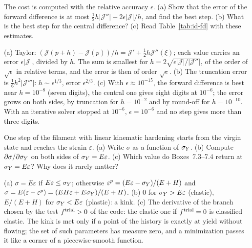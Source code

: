 \label{exo:id-q-fd}
%
The cost is computed with the relative accuracy $\epsilon$. (a) Show that the error
of the forward difference is at most
$\tfrac12h|\mathcal J''|+2\epsilon|\mathcal J|/h$, and find the best step. (b) What is the
best step for the central difference? (c) Read Table~\ref{tab:id-fd} with these
estimates.
\begin{solution}
(a) Taylor: $(\mathcal J(p+h)-\mathcal J(p))/h=\mathcal J'+\tfrac12h\mathcal J''(\xi)$; each value carries
an error $\epsilon|\mathcal J|$, divided by $h$. The sum is smallest for
$h=2\sqrt{\epsilon|\mathcal J|/|\mathcal J''|}$, of the order of $\sqrt\epsilon$ in relative terms,
and the error is then of order $\sqrt\epsilon$. (b) The truncation error is
$\tfrac16h^2|\mathcal J'''|$: $h\sim\epsilon^{1/3}$, error $\epsilon^{2/3}$. (c) With
$\epsilon\approx10^{-15}$, the forward difference is best near $h=10^{-8}$ (seven digits),
the central one gives eight digits at $10^{-6}$; the error grows on both sides, by
truncation for $h=10^{-2}$ and by round-off for $h=10^{-10}$. With an iterative
solver stopped at $10^{-6}$, $\epsilon=10^{-6}$ and no step gives more than three
digits.
\end{solution}

\label{exo:id-q-kink}
%
One step of the filament with linear kinematic hardening starts from the virgin
state and reaches the strain $\varepsilon$. (a) Write $\sigma$ as a function of $\sigma_{Y}$.
(b) Compute $\partial\sigma/\partial\sigma_{Y}$ on both sides of $\sigma_{Y}=E\varepsilon$. (c) Which
value do Boxes~7.3--7.4 return at $\sigma_{Y}=E\varepsilon$? Why does it rarely matter?
\begin{solution}
(a) $\sigma=E\varepsilon$ if $E\varepsilon\le\sigma_{Y}$; otherwise
$\varepsilon^p=(E\varepsilon-\sigma_{Y})/(E+H)$ and $\sigma=E(\varepsilon-\varepsilon^p)=(EH\varepsilon+E\sigma_{Y})/(E+H)$.
(b) $0$ for $\sigma_{Y}>E\varepsilon$ (elastic), $E/(E+H)$ for $\sigma_{Y}<E\varepsilon$ (plastic): a
kink. (c) The derivative of the branch chosen by the test $f^{\mathrm{trial}}>0$ of the code:
the elastic one if $f^{\mathrm{trial}}=0$ is classified elastic. The kink is met only if a
point of the history is exactly at yield without flowing; the set of such
parameters has measure zero, and a minimization passes it like a corner of a
piecewise-smooth function.
\end{solution}

